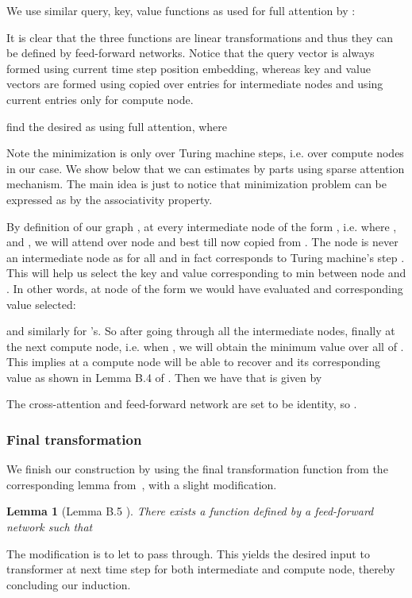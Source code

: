 \documentclass{article}
\newtheorem{lemma}{Lemma}
\begin{document}
We use similar query, key, value functions as used for full attention by \citep{Perez19} :


It is clear that the three functions are linear transformations and thus they can be defined by feed-forward networks. Notice that the query vector is always formed using current time step position embedding, whereas key and value vectors are formed using copied over entries for intermediate nodes and using current entries only for compute node.

\citet{Perez19} find the desired  as  using full attention, where

Note the minimization is only over Turing machine steps, i.e. over compute nodes in our case.
We show below that we can estimates  by parts using sparse attention mechanism. The main idea is just to notice that minimization problem  can be expressed as  by the associativity property.

By definition of our graph , at every intermediate node  of the form , i.e. where ,  and , we will attend over node  and best till now copied from .
The node  is never an intermediate node as  for all  and in fact corresponds to Turing machine's step .
This will help us select the key and value corresponding to min between node  and .
In other words, at node  of the form  we would have evaluated  and corresponding value selected:

and similarly for 's.
So after going through all the intermediate nodes, finally at the next compute node, i.e. when , we will obtain the minimum value over all of .
This implies at a compute node will be able to recover  and its corresponding value as shown in Lemma B.4 of \citep{Perez19}.
Then we have that  is given by

The cross-attention and feed-forward network are set to be identity, so .


\subsubsection{Final transformation}
We finish our construction by using the final transformation function  from the corresponding lemma from~\citet{Perez19}, with a slight modification.
\begin{lemma}[Lemma B.5 \citep{Perez19}]
\label{lem:yr+1}
There exists a function  defined by a feed-forward network such that

\end{lemma}
The modification is to let  to pass through.
This yields the desired input to transformer at next time step for both intermediate and compute node, thereby concluding our induction. 
\newpage
\end{document}
